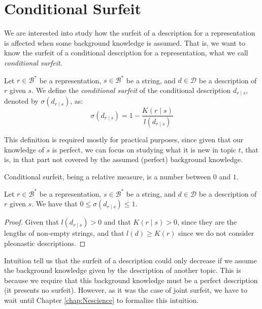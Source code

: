 \section{Conditional Surfeit}

We are interested into study how the surfeit of a description for a representation is affected when some background knowledge is assumed. That is, we want to know the surfeit of a conditional description for a representation, what we call \emph{conditional surfeit}.

\begin{definition}
Let $r \in \mathcal{B}^\ast$ be a representation, $s \in \mathcal{B}^\ast$ be a string, and $d \in \mathcal{D}$ be a description of $r$ given $s$. We define the \emph{conditional surfeit} of the conditional description $d_{r \mid s}$, denoted by $\sigma(d_{r \mid s})$, as: 
\[
\sigma(d_{r \mid s}) = 1 - \frac{K\left( r \mid s \right)}{l \left( d_{r \mid s} \right)}
\]
\end{definition}

This definition is required mostly for practical purposes, since given that our knowledge of $s$ is perfect, we can focus on studying what it is new in topic $t$, that is, in that part not covered by the assumed (perfect) background knowledge.

Conditional surfeit, being a relative measure, is a number between $0$ and $1$.

\begin{proposition}
Let $r \in \mathcal{B}^\ast$ be a representation, $s \in \mathcal{B}^\ast$ be a string, and $d \in \mathcal{D}$ be a description of $r$ given $s$. We have that $0 \leq \sigma(d_{r \mid s}) \leq 1$.
\end{proposition}
\begin{proof}
Given that $l \left( d_{r \mid s} \right) > 0$ and that $K\left( r \mid s \right) > 0$, since they are the lengths of non-empty strings, {\color{red} and that $l\left( d \right) \geq K\left( r \right)$ since we do not consider pleonastic descriptions}.

\end{proof}

Intuition tell us that the surfeit of a description could only decrease if we assume the background knowledge given by the description of another topic. This is because we require that this background knowledge must be a perfect description (it presents no surfeit). However, as it was the case of joint surfeit, we have to wait until Chapter \ref{chap:Nescience} to formalize this intuition.

